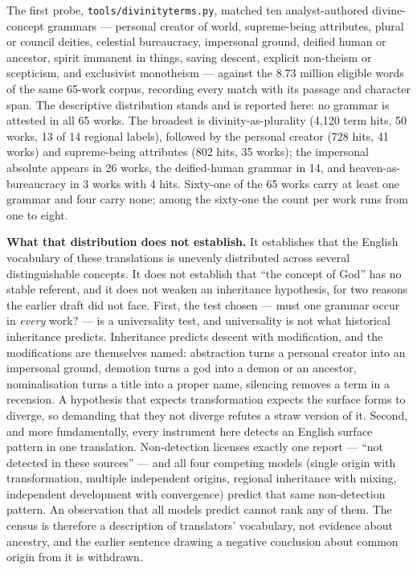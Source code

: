 \documentclass[11pt]{article}
\DeclareRobustCommand{\_}{\textunderscore\allowbreak}
\begin{document}
The first probe, \texttt{tools/divinity\_terms.py}, matched ten
analyst-authored divine-concept grammars --- personal creator of world,
supreme-being attributes, plural or council deities, celestial bureaucracy,
impersonal ground, deified human or ancestor, spirit immanent in things, saving
descent, explicit non-theism or scepticism, and exclusivist monotheism --- against
the 8.73 million eligible words of the same 65-work corpus, recording every match
with its passage and character span. The descriptive distribution stands and is
reported here: no grammar is attested in all 65 works. The broadest is
divinity-as-plurality (4{,}120 term hits, 50 works, 13 of 14 regional labels),
followed by the personal creator (728 hits, 41 works) and supreme-being attributes
(802 hits, 35 works); the impersonal absolute appears in 26 works, the
deified-human grammar in 14, and heaven-as-bureaucracy in 3 works with 4 hits.
Sixty-one of the 65 works carry at least one grammar and four carry none; among the
sixty-one the count per work runs from one to eight.

\textbf{What that distribution does not establish.} It establishes that the
English vocabulary of these translations is unevenly distributed across several
distinguishable concepts. It does not establish that ``the concept of God'' has no
stable referent, and it does not weaken an inheritance hypothesis, for two
reasons the earlier draft did not face. First, the test chosen --- must one
grammar occur in \emph{every} work? --- is a universality test, and universality
is not what historical inheritance predicts. Inheritance predicts descent with
modification, and the modifications are themselves named: abstraction turns a
personal creator into an impersonal ground, demotion turns a god into a demon or
an ancestor, nominalisation turns a title into a proper name, silencing removes a
term in a recension. A hypothesis that expects transformation expects the surface
forms to diverge, so demanding that they not diverge refutes a straw version of
it. Second, and more fundamentally, every instrument here detects an English
surface pattern in one translation. Non-detection licenses exactly one report ---
``not detected in these sources'' --- and all four competing models (single origin
with transformation, multiple independent origins, regional inheritance with
mixing, independent development with convergence) predict that same
non-detection pattern. An observation that all models predict cannot rank any of
them. The census is therefore a description of translators' vocabulary, not
evidence about ancestry, and the earlier sentence drawing a negative conclusion
about common origin from it is withdrawn.
\end{document}
